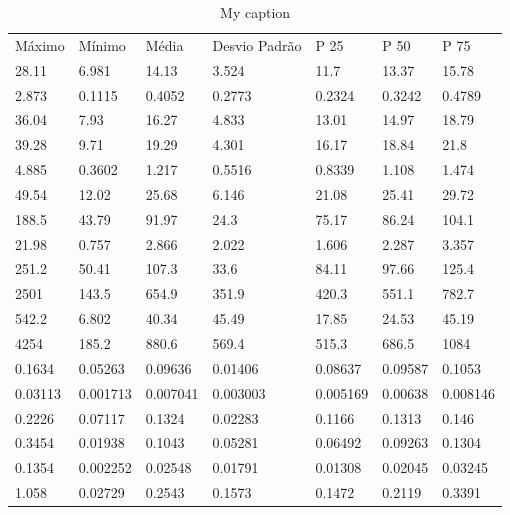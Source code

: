 \documentclass[11pt,a4paper]{article}
\numberwithin{equation}{section}
\begin{document}
\begin{table}[]
\centering
\caption{My caption}
\label{my-label}
\begin{tabular}{lllllll}
Máximo  & Mínimo   & Média    & Desvio Padrão & P 25 & P 50 & P 75 \\
28.11   & 6.981    & 14.13    & 3.524         & 11.7         & 13.37        & 15.78        \\
2.873   & 0.1115   & 0.4052   & 0.2773        & 0.2324       & 0.3242       & 0.4789       \\
36.04   & 7.93     & 16.27    & 4.833         & 13.01        & 14.97        & 18.79        \\
39.28   & 9.71     & 19.29    & 4.301         & 16.17        & 18.84        & 21.8         \\
4.885   & 0.3602   & 1.217    & 0.5516        & 0.8339       & 1.108        & 1.474        \\
49.54   & 12.02    & 25.68    & 6.146         & 21.08        & 25.41        & 29.72        \\
188.5   & 43.79    & 91.97    & 24.3          & 75.17        & 86.24        & 104.1        \\
21.98   & 0.757    & 2.866    & 2.022         & 1.606        & 2.287        & 3.357        \\
251.2   & 50.41    & 107.3    & 33.6          & 84.11        & 97.66        & 125.4        \\
2501    & 143.5    & 654.9    & 351.9         & 420.3        & 551.1        & 782.7        \\
542.2   & 6.802    & 40.34    & 45.49         & 17.85        & 24.53        & 45.19        \\
4254    & 185.2    & 880.6    & 569.4         & 515.3        & 686.5        & 1084         \\
0.1634  & 0.05263  & 0.09636  & 0.01406       & 0.08637      & 0.09587      & 0.1053       \\
0.03113 & 0.001713 & 0.007041 & 0.003003      & 0.005169     & 0.00638      & 0.008146     \\
0.2226  & 0.07117  & 0.1324   & 0.02283       & 0.1166       & 0.1313       & 0.146        \\
0.3454  & 0.01938  & 0.1043   & 0.05281       & 0.06492      & 0.09263      & 0.1304       \\
0.1354  & 0.002252 & 0.02548  & 0.01791       & 0.01308      & 0.02045      & 0.03245      \\
1.058   & 0.02729  & 0.2543   & 0.1573        & 0.1472       & 0.2119       & 0.3391       \\

\end{tabular}
\end{table}
\end{document}
